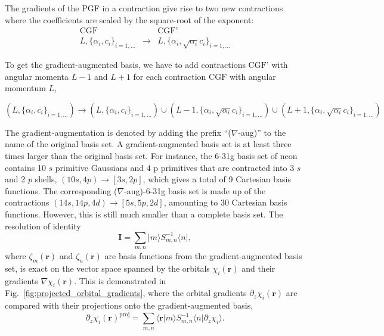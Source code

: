 \documentclass[journal=jacsat,manuscript=article]{achemso}
\newcommand\m[1]{\mathbf{#1}}
\renewcommand\vec[1]{\mathbf{#1}}
\begin{document}
The gradients of the PGF in a contraction give rise to two new contractions where the coefficients are scaled by the square-root of the exponent:
\begin{eqnarray}
  \text{CGF} & & \text{CGF'} \\
  L, \{\alpha_i, c_i\}_{i=1,\ldots} & \longrightarrow & L, \{\alpha_i, \sqrt{\alpha_i} c_i\}_{i=1,\ldots}
\end{eqnarray}

To get the gradient-augmented basis, we have to add contractions $\text{CGF'}$ with angular momenta $L-1$ and $L+1$ for each contraction $\text{CGF}$ with angular momentum $L$,

\begin{equation}
  (L, \{\alpha_i, c_i\}_{i=1,\ldots}) \longrightarrow
         (L, \{\alpha_i, c_i\}_{i=1,\ldots})
      \cup (L-1, \{\alpha_i, \sqrt{\alpha_i} c_i\}_{i=1,\ldots})
      \cup (L+1, \{\alpha_i, \sqrt{\alpha_i} c_i\}_{i=1,\ldots})
\end{equation}

The gradient-augmentation is denoted by adding the prefix ``($\nabla$-aug)'' to the name of the original basis set.
A gradient-augmented basis set is at least three times larger than the original basis set. For instance, the 6-31g basis set of neon contains 10 $s$ primitive Gaussians and $4$ p primitives that are contracted into 3 $s$ and 2 $p$ shells, $(10s,4p) \rightarrow [3s, 2p]$, which gives a total of 9 Cartesian basis functions. The corresponding ($\nabla$-aug)-6-31g basis set is made up of the contractions $(14s,14p,4d) \rightarrow [5s,5p,2d]$, amounting to 30 Cartesian basis functions.
However, this is still much smaller than a complete basis set. The resolution of identity
\begin{equation}
\m{I} = \sum_{m,n} \vert m \rangle S^{-1}_{m,n} \langle n \vert,
\end{equation}
where $\zeta_m(\vec{r})$ and $\zeta_n(\vec{r})$ are basis functions from the gradient-augmented basis set, is exact on the vector space spanned by the orbitals $\chi_i(\vec{r})$ and their gradients $\nabla \chi_i(\vec{r})$. This is demonstrated in Fig.~\ref{fig:projected_orbital_gradients}, where the orbital gradients $\partial_z \chi_i(\vec{r})$ are compared with their projections onto the gradient-augmented basis,
\begin{equation}
\partial_z \chi_i(\vec{r})^{\text{proj}} = \sum_{m,n} \langle \vec{r} \vert m \rangle S^{-1}_{m,n} \langle n \vert \partial_z \chi_i \rangle.
\end{equation}
\end{document}
